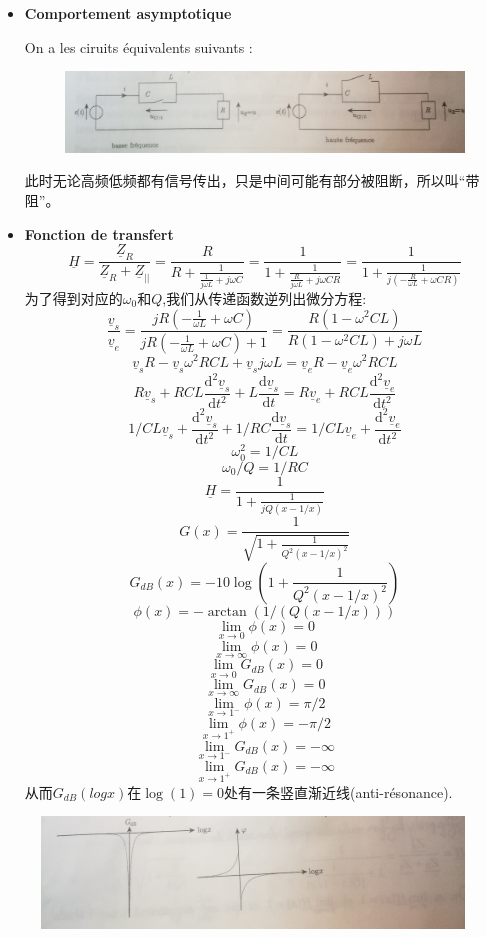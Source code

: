 \documentclass[12pt]{book}
\theoremstyle{definition}\newtheorem{dfn}{Définition}[chapter]
\theoremstyle{plain}\newtheorem{thm}{Théorème}[chapter]
\theoremstyle{plain}\newtheorem{prp}{Proposition}[chapter]
\theoremstyle{plain}\newtheorem{lem}{\bf Lemme}[chapter]
\theoremstyle{plain}\newtheorem{axm}{\bf Axiome}[chapter]
\theoremstyle{plain}\newtheorem{lmm}{\bf Lemme}[chapter]
\theoremstyle{plain}\newtheorem{cor}{\bf Corollaire}[chapter]
\theoremstyle{remark}\newtheorem{rem}{Remarque}[chapter]
\begin{document}
\begin{itemize}
	\item \textbf{Comportement asymptotique}
	
	On a les ciruits équivalents suivants :
	\begin{figure}[H]
		\centering
		\includegraphics[scale=0.16]{image//Filtrage//9}
	\end{figure}
此时无论高频低频都有信号传出，只是中间可能有部分被阻断，所以叫“带阻”。



\item \textbf{Fonction de transfert}
$$
\underline{H}=\frac{\underline{Z}_R}{\underline{Z}_R+\underline{Z}_{||}}=\frac{R}{R+\frac{1}{\frac{1}{j\omega L}+j\omega C}}=\frac{1}{1+\frac{1}{\frac{R}{j\omega L}+j\omega CR}}=\frac{1}{1+\frac{1}{j(-\frac{R}{\omega L}+\omega CR)}}
$$
为了得到对应的$\omega_0$和$Q$,我们从传递函数逆列出微分方程:
$$
\frac{\underline{v}_s}{\underline{v}_e}=\frac{jR(-\frac{1}{\omega L}+\omega C)}{jR(-\frac{1}{\omega L}+\omega C)+1}=\frac{R(1-\omega^2 CL)}{R(1-\omega^2 CL)+j\omega L}
$$
$$
\underline{v}_sR-\underline{v}_s\omega^2 RCL+\underline{v}_sj\omega L=\underline{v}_eR-\underline{v}_e\omega^2 RCL
$$
$$
R\underline{v}_s+RCL\frac{\mathrm{d^2}\underline{v}_s}{\mathrm{d}t^2}+L\frac{\mathrm{d}\underline{v}_s}{\mathrm{d}t}=R\underline{v}_e+RCL\frac{\mathrm{d^2}\underline{v}_e}{\mathrm{d}t^2}
$$
$$
1/CL\underline{v}_s+\frac{\mathrm{d^2}\underline{v}_s}{\mathrm{d}t^2}+1/RC\frac{\mathrm{d}\underline{v}_s}{\mathrm{d}t}=1/CL\underline{v}_e+\frac{\mathrm{d^2}\underline{v}_e}{\mathrm{d}t^2}
$$
$$\omega_0^2=1/CL$$
$$\omega_0/Q=1/RC$$
$$\boxed{  \underline{H}=\frac{1}{1+\frac{1}{jQ(x-1/x)}}}  $$
$$
G(x)=\frac{1}{\sqrt{1+\frac{1}{Q^2(x-1/x)^2}}}
$$
$$
G_{dB}(x)=-10\log(1+\frac{1}{Q^2(x-1/x)^2})
$$
$$
\phi(x)=-\arctan(1/(Q(x-1/x)))
$$
$$
\lim\limits_{x\to0}\phi(x)=0
$$
$$
\lim\limits_{x\to\infty}\phi(x)=0
$$
$$
\lim\limits_{x\to0}G_{dB}(x)=0
$$
$$
\lim\limits_{x\to\infty}G_{dB}(x)=0
$$
$$
\lim\limits_{x\to1^{-}}\phi(x)=\pi/2
$$
$$
\lim\limits_{x\to1^{+}}\phi(x)=-\pi/2
$$
$$
\lim\limits_{x\to1^{-}}G_{dB}(x)=-\infty
$$
$$
\lim\limits_{x\to1^{+}}G_{dB}(x)=-\infty
$$
从而$G_{dB}(logx)$在$\log(1)=0$处有一条竖直渐近线(anti-résonance).
\end{itemize}
\begin{figure}[H]
	\centering
	\includegraphics[scale=0.15]{image//Filtrage//10}
\end{figure}
\end{document}
